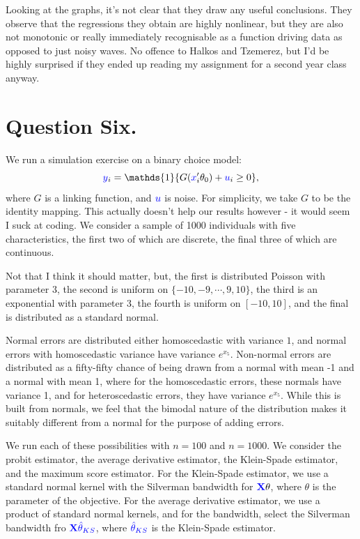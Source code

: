 \documentclass{article}
\renewcommand{\vec}[1]{\mathbf{#1}}
\renewcommand{\r}[1]{\textcolor{blue}{#1}}
\begin{document}
Looking at the graphs, it's not clear that they draw any useful conclusions. They observe that the regressions they obtain are highly nonlinear, but they are also not monotonic or really immediately recognisable as a function driving data as opposed to just noisy waves. No offence to Halkos and Tzemerez, but I'd be highly surprised if they ended up reading my assignment for a second year class anyway.



\section{Question Six.}
We run a simulation exercise on a binary choice model:
\begin{equation} \r{y}_{i} = \mathds{1}\{G(\r{x}_{i}'\theta_{0})+\r{u}_{i}\geq0\},\end{equation}
where $G$ is a linking function, and $\r{u}$ is noise. For simplicity, we take $G$ to be the identity mapping. This actually doesn't help our results however - it would seem I suck at coding. We consider a sample of 1000 individuals with five characteristics, the first two of which are discrete, the final three of which are continuous. 

Not that I think it should matter, but, the first is distributed Poisson with parameter 3, the second is uniform on $\{-10,-9,\cdots,9,10\}$, the third is an exponential with parameter 3, the fourth is uniform on $[-10,10]$, and the final is distributed as a standard normal. 

Normal errors are distributed either homoscedastic with variance $1$, and normal errors with homoscedastic variance have variance $e^{x_{5}}$. Non-normal errors are distributed as a fifty-fifty chance of being drawn from a normal with mean -1 and a normal with mean 1, where for the homoscedastic errors, these normals have variance 1, and for heteroscedastic errors, they have variance $e^{x_{5}}$. While this is built from normals, we feel that the bimodal nature of the distribution makes it suitably different from a normal for the purpose of adding errors.

We run each of these possibilities with $n=100$ and $n=1000$. We consider the probit estimator, the average derivative estimator, the Klein-Spade estimator, and the maximum score estimator. For the Klein-Spade estimator, we use a standard normal kernel with the Silverman bandwidth for $\vec{\r{X}}\theta$, where $\theta$ is the parameter of the objective. For the average derivative estimator, we use a product of standard normal kernels, and for the bandwidth, select the Silverman bandwidth fro $\vec{\r{X}}\r{\hat{\theta}_{KS}}$, where $\r{\hat{\theta}_{KS}}$ is the Klein-Spade estimator.
\end{document}
